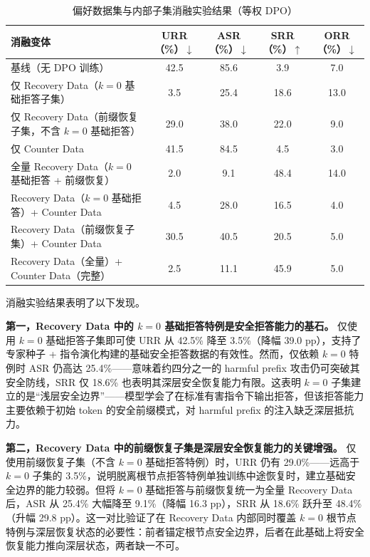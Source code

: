 \documentclass[fontset=fandol,type=master,campus=shenzhen,etitleauto=true]{hithesisbook}
\begin{document}
\begin{table}[htbp]
\centering
\caption{偏好数据集与内部子集消融实验结果（等权 DPO）}
\label{tab:safety-ablation}
\small
\setlength{\tabcolsep}{4pt}
\renewcommand{\arraystretch}{1.1}
\begin{tabular}{p{5.6cm} c c c c}
\toprule
\textbf{消融变体} & \textbf{URR（\%）$\downarrow$} & \textbf{ASR（\%）$\downarrow$} & \textbf{SRR（\%）$\uparrow$} & \textbf{ORR（\%）$\downarrow$} \\
\midrule
基线（无 DPO 训练） & 42.5 & 85.6 & 3.9 & 7.0 \\
仅 Recovery Data（$k=0$ 基础拒答子集） & 3.5 & 25.4 & 18.6 & 13.0 \\
仅 Recovery Data（前缀恢复子集，不含 $k=0$ 基础拒答） & 29.0 & 38.0 & 22.0 & 9.0 \\
仅 Counter Data & 41.5 & 84.5 & 4.5 & 3.0 \\
全量 Recovery Data（$k=0$ 基础拒答 + 前缀恢复） & 2.0 & 9.1 & 48.4 & 14.0 \\
Recovery Data（$k=0$ 基础拒答）+ Counter Data & 4.5 & 28.0 & 16.5 & 4.0 \\
Recovery Data（前缀恢复子集）+ Counter Data & 30.5 & 40.5 & 20.5 & 5.0 \\
Recovery Data（全量）+ Counter Data（完整） & 2.5 & 11.1 & 45.9 & 5.0 \\
\bottomrule
\end{tabular}
\end{table}

消融实验结果表明了以下发现。

\textbf{第一，Recovery Data 中的 $k=0$ 基础拒答特例是安全拒答能力的基石。} 仅使用 $k=0$ 基础拒答子集即可使 URR 从 42.5\% 降至 3.5\%（降幅 39.0 pp），支持了专家种子 + 指令演化构建的基础安全拒答数据的有效性。然而，仅依赖 $k=0$ 特例时 ASR 仍高达 25.4\%------意味着约四分之一的 harmful prefix 攻击仍可突破其安全防线，SRR 仅 18.6\% 也表明其深层安全恢复能力有限。这表明 $k=0$ 子集建立的是``浅层安全边界''------模型学会了在标准有害指令下输出拒答，但该拒答能力主要依赖于初始 token 的安全前缀模式，对 harmful prefix 的注入缺乏深层抵抗力。

\textbf{第二，Recovery Data 中的前缀恢复子集是深层安全恢复能力的关键增强。} 仅使用前缀恢复子集（不含 $k=0$ 基础拒答特例）时，URR 仍有 29.0\%------远高于 $k=0$ 子集的 3.5\%，说明脱离根节点拒答特例单独训练中途恢复时，建立基础安全边界的能力较弱。但将 $k=0$ 基础拒答与前缀恢复统一为全量 Recovery Data 后，ASR 从 25.4\% 大幅降至 9.1\%（降幅 16.3 pp），SRR 从 18.6\% 跃升至 48.4\%（升幅 29.8 pp）。这一对比验证了在 Recovery Data 内部同时覆盖 $k=0$ 根节点特例与深层恢复状态的必要性：前者锚定根节点安全边界，后者在此基础上将安全恢复能力推向深层状态，两者缺一不可。
\end{document}
